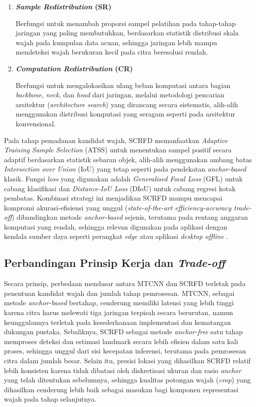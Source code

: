 \begin{enumerate}
	\item \textbf{\textit{Sample Redistribution} (SR) }
	
	Berfungsi untuk menambah proporsi sampel pelatihan pada tahap-tahap jaringan yang paling membutuhkan, berdasarkan statistik distribusi skala wajah pada kumpulan data acuan, sehingga jaringan lebih mampu mendeteksi wajah berukuran kecil pada citra beresolusi rendah.
	
	\item \textbf{\textit{Computation Redistribution} (CR)}
	
	Berfungsi untuk mengalokasikan ulang beban komputasi antara bagian \textit{backbone}, \textit{neck}, dan \textit{head} dari jaringan, melalui metodologi pencarian arsitektur (\textit{architecture search}) yang dirancang secara sistematis, alih-alih menggunakan distribusi komputasi yang seragam seperti pada arsitektur konvensional.

\end{enumerate}

Pada tahap pemadanan kandidat wajah, SCRFD memanfaatkan \textit{Adaptive Training Sample Selection} (ATSS) untuk menentukan sampel positif secara adaptif berdasarkan statistik sebaran objek, alih-alih menggunakan ambang batas \textit{Intersection over Union} (IoU) yang tetap seperti pada pendekatan \textit{anchor-based} klasik. Fungsi \textit{loss} yang digunakan adalah \textit{Generalised Focal Loss} (GFL) untuk cabang klasifikasi dan \textit{Distance-IoU Loss} (DIoU) untuk cabang regresi kotak pembatas. Kombinasi strategi ini menjadikan SCRFD mampu mencapai kompromi akurasi-efisiensi yang unggul (\textit{state-of-the-art efficiency-accuracy trade-off}) dibandingkan metode \textit{anchor-based} sejenis, terutama pada rentang anggaran komputasi yang rendah, sehingga relevan digunakan pada aplikasi dengan kendala sumber daya seperti perangkat \textit{edge} atau aplikasi \textit{desktop offline} \autocite{guo2021scrfd}.

\subsection{Perbandingan Prinsip Kerja dan \textit{Trade-off}}

Secara prinsip, perbedaan mendasar antara MTCNN dan SCRFD terletak pada penentuan kandidat wajah dan jumlah tahap pemrosesan. MTCNN, sebagai metode \textit{anchor-based} bertahap, cenderung memiliki latensi yang lebih tinggi karena citra harus melewati tiga jaringan terpisah secara berurutan, namun keunggulannya terletak pada kesederhanaan implementasi dan kematangan dukungan pustaka. Sebaliknya, SCRFD sebagai metode \textit{anchor-free} satu tahap memproses deteksi dan estimasi landmark secara lebih efisien dalam satu kali proses, sehingga unggul dari sisi kecepatan inferensi, terutama pada pemrosesan citra dalam jumlah besar. Selain itu, presisi lokasi yang dihasilkan SCRFD relatif lebih konsisten karena tidak dibatasi oleh diskretisasi ukuran dan rasio \textit{anchor} yang telah ditentukan sebelumnya, sehingga kualitas potongan wajah (\textit{crop}) yang dihasilkan cenderung lebih baik sebagai masukan bagi komponen representasi wajah pada tahap selanjutnya.

